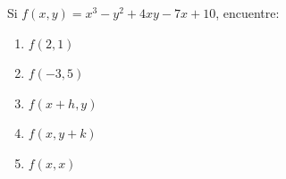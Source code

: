 \item Si $f(x, y) = x^3 - y^2 + 4xy - 7x + 10$, encuentre:
\begin{enumerate}
    \item $f(2, 1)$
    \item $f(-3, 5)$
    \item $f(x + h, y)$
    \item $f(x, y + k)$
    \item $f(x, x)$
\end{enumerate}
